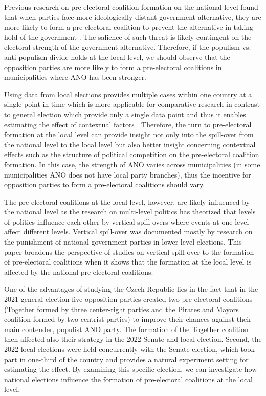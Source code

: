 \documentclass[]{interact}
\theoremstyle{plain}%
\theoremstyle{definition}
\theoremstyle{remark}
\begin{document}
Previous research on pre-electoral coalition formation on the national level found that when parties face more ideologically distant government alternative, they are more likely to form a pre-electoral coalition to prevent the alternative in taking hold of the government \citep{golder2006}. The salience of such threat is likely contingent on the electoral strength of the government alternative. Therefore, if the populism vs. anti-populism divide holds at the local level, we should observe that the opposition parties are more likely to form a pre-electoral coalitions in municipalities where ANO has been stronger. 

Using data from local elections provides multiple cases within one country at a single point in time which is more applicable for comparative research in contrast to general election which provide only a single data point and thus it enables estimating the effect of contextual factors \citep[77]{back2008}. Therefore, the turn to pre-electoral formation at the local level can provide insight not only into the spill-over from the national level to the local level but also better insight concerning contextual effects such as the structure of political competition on the pre-electoral coalition formation. In this case, the strength of ANO varies across municipalities (in some municipalities ANO does not have local party branches), thus the incentive for opposition parties to form a pre-electoral coalitions should vary.

The pre-electoral coalitions at the local level, however, are likely influenced by the national level as the research on multi-level politics has theorized that levels of politics influence each other by vertical spill-overs where events at one level affect different levels. Vertical spill-over was documented mostly by research on the punishment of national government parties in lower-level elections. This paper broadens the perspective of studies on vertical spill-over to the formation of pre-electoral coalitions when it shows that the formation at the local level is affected by the national pre-electoral coalitions. 

One of the advantages of studying the Czech Republic lies in the fact that in the 2021 general election five opposition parties created two pre-electoral coalitions (Together formed by three center-right parties and the Pirates and Mayors coalition formed by two centrist parties) to improve their chances against their main contender, populist ANO party. The formation of the Together coalition then affected also their strategy in the 2022 Senate and local election. Second, the 2022 local elections were held concurrently with the Senate election, which took part in one-third of the country and provides a natural experiment setting for estimating the effect. By examining this specific election, we can investigate how national elections influence the formation of
pre-electoral coalitions at the local level.
\end{document}
